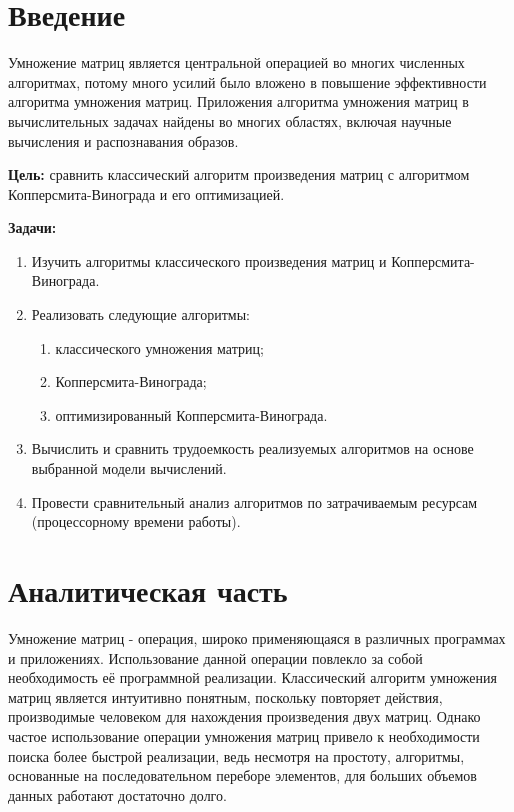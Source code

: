 \documentclass[12pt]{report}
\begin{document}
    \sloppy
    
    \tableofcontents

    \newpage
    \chapter*{Введение}

    Умножение матриц является центральной операцией во многих численных алгоритмах,
    потому много усилий было вложено в повышение эффективности алгоритма умножения матриц.
    Приложения алгоритма умножения матриц в вычислительных задачах найдены во многих областях,
    включая научные вычисления и распознавания образов.

    \textbf{Цель:} сравнить классический алгоритм произведения матриц с алгоритмом
    Копперсмита-Винограда и его оптимизацией.

    \textbf{Задачи:}
    \begin{enumerate}
        \item Изучить алгоритмы классического произведения матриц и Копперсмита-Винограда.
        \item Реализовать следующие алгоритмы:
        \begin{enumerate}
            \item классического умножения матриц;
            \item Копперсмита-Винограда;
            \item оптимизированный Копперсмита-Винограда.
        \end{enumerate}
        \item Вычислить и сравнить трудоемкость реализуемых алгоритмов на основе выбранной модели вычислений.
        \item Провести сравнительный анализ алгоритмов по затрачиваемым ресурсам (процессорному времени работы).
    \end{enumerate}
    \newpage


    \chapter{ Аналитическая часть}
    Умножение матриц - операция, широко применяющаяся в различных программах и приложениях.
    Использование данной операции повлекло за собой необходимость её программной реализации.
    Классический алгоритм умножения матриц является интуитивно понятным, поскольку повторяет действия,
    производимые человеком для нахождения произведения двух матриц.
    Однако частое использование операции умножения матриц привело к необходимости поиска более
    быстрой реализации, ведь несмотря на простоту, алгоритмы, основанные на последовательном переборе
    элементов, для больших объемов данных работают достаточно долго.
\end{document}
